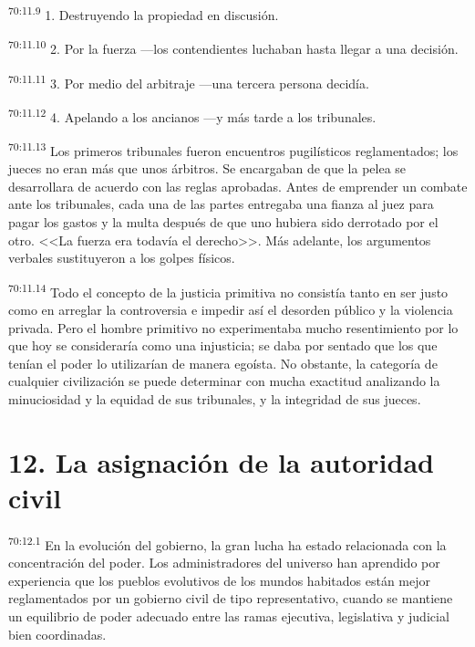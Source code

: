 \documentclass[twoside, 11pt]{book}
\begin{document}
\par
\textsuperscript{70:11.9} 1. Destruyendo la propiedad en discusión.

\par
\textsuperscript{70:11.10} 2. Por la fuerza ---los contendientes luchaban hasta llegar a una decisión.

\par
\textsuperscript{70:11.11} 3. Por medio del arbitraje ---una tercera persona decidía.

\par
\textsuperscript{70:11.12} 4. Apelando a los ancianos ---y más tarde a los tribunales.

\par
\textsuperscript{70:11.13} Los primeros tribunales fueron encuentros pugilísticos reglamentados; los jueces no eran más que unos árbitros. Se encargaban de que la pelea se desarrollara de acuerdo con las reglas aprobadas. Antes de emprender un combate ante los tribunales, cada una de las partes entregaba una fianza al juez para pagar los gastos y la multa después de que uno hubiera sido derrotado por el otro. <<La fuerza era todavía el derecho>>. Más adelante, los argumentos verbales sustituyeron a los golpes físicos.

\par
\textsuperscript{70:11.14} Todo el concepto de la justicia primitiva no consistía tanto en ser justo como en arreglar la controversia e impedir así el desorden público y la violencia privada. Pero el hombre primitivo no experimentaba mucho resentimiento por lo que hoy se consideraría como una injusticia; se daba por sentado que los que tenían el poder lo utilizarían de manera egoísta. No obstante, la categoría de cualquier civilización se puede determinar con mucha exactitud analizando la minuciosidad y la equidad de sus tribunales, y la integridad de sus jueces.

\section*{12. La asignación de la autoridad civil}
\par
\textsuperscript{70:12.1} En la evolución del gobierno, la gran lucha ha estado relacionada con la concentración del poder. Los administradores del universo han aprendido por experiencia que los pueblos evolutivos de los mundos habitados están mejor reglamentados por un gobierno civil de tipo representativo, cuando se mantiene un equilibrio de poder adecuado entre las ramas ejecutiva, legislativa y judicial bien coordinadas.
\end{document}
